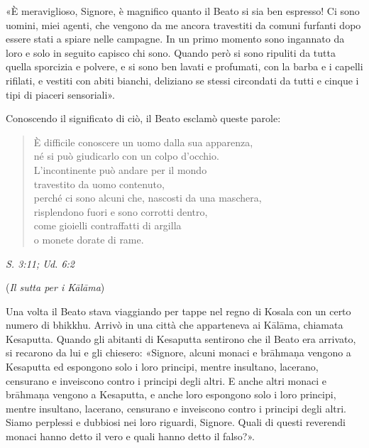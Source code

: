 «È meraviglioso, Signore, è magnifico quanto il Beato si sia ben
espresso! Ci sono uomini, miei agenti, che vengono da me ancora
travestiti da comuni furfanti dopo essere stati a spiare nelle campagne.
In un primo momento sono ingannato da loro e solo in seguito capisco chi
sono. Quando però si sono ripuliti da tutta quella sporcizia e polvere,
e si sono ben lavati e profumati, con la barba e i capelli rifilati, e
vestiti con abiti bianchi, deliziano se stessi circondati da tutti e
cinque i tipi di piaceri sensoriali».


Conoscendo il significato di ciò, il Beato esclamò queste parole:


\begin{quote}
È difficile conoscere un uomo dalla sua apparenza, \\
né si può giudicarlo con un colpo d’occhio. \\
L’incontinente può andare per il mondo \\
travestito da uomo contenuto, \\
perché ci sono alcuni che, nascosti da una maschera, \\
risplendono fuori e sono corrotti dentro, \\
come gioielli contraffatti di argilla \\
o monete dorate di rame.
\end{quote}

\emph{S. 3:11; Ud. 6:2}


(\emph{Il sutta per i Kālāma})


Una volta il Beato stava viaggiando per tappe nel regno di Kosala con un
certo numero di bhikkhu. Arrivò in una città che apparteneva ai Kālāma,
chiamata Kesaputta. Quando gli abitanti di Kesaputta sentirono che il
Beato era arrivato, si recarono da lui e gli chiesero: «Signore, alcuni
monaci e brāhmaṇa vengono a Kesaputta ed espongono solo i loro principi,
mentre insultano, lacerano, censurano e inveiscono contro i principi
degli altri. E anche altri monaci e brāhmaṇa vengono a Kesaputta, e
anche loro espongono solo i loro principi, mentre insultano, lacerano,
censurano e inveiscono contro i principi degli altri. Siamo perplessi e
dubbiosi nei loro riguardi, Signore. Quali di questi reverendi monaci
hanno detto il vero e quali hanno detto il falso?».


